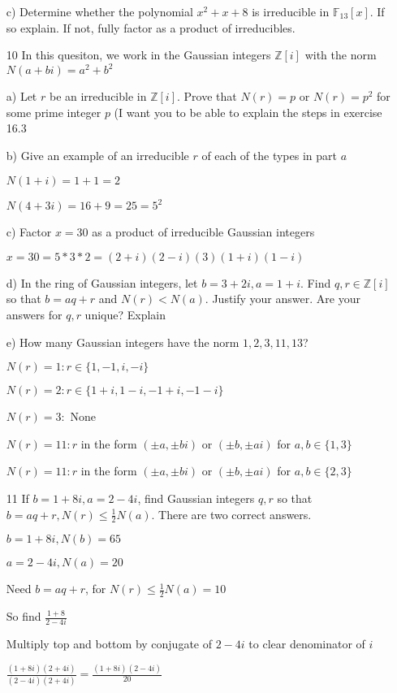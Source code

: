 \documentclass[12pt]{article}
\begin{document}
\begin{itemize}
		c) Determine whether the polynomial $x^2 + x + 8$ is irreducible in $\mathbb{F}_{13}[x]$. If so explain. If not, fully factor as a product of irreducibles.

	\item[10] In this quesiton, we work in the Gaussian integers $\mathbb{Z}[i]$  with the norm $N(a+bi) = a^2 + b^2$

		a) Let $r$ be an irreducible in $\mathbb{Z}[i]$. Prove that $N(r) = p$ or $N(r) = p^2$ for some prime integer $p$ (I want you to be able to explain the steps in exercise 16.3

		b) Give an example of an irreducible $r$ of each of the types in part $a$

		$N(1+i) = 1 + 1 = 2$

		$N(4 + 3i) = 16 + 9 = 25 = 5^2$

		c) Factor $x = 30$ as a product of irreducible Gaussian integers

		$x = 30 = 5 * 3 * 2 = (2 + i)(2-i)(3)(1+i)(1-i)$

		d) In the ring of Gaussian integers, let $b = 3 + 2i, a = 1+ i$. Find $q,r \in \mathbb{Z}[i]$ so that $b = aq + r$ and $N(r) < N(a)$. Justify your answer. Are your answers for $q,r$ unique? Explain

		e) How many Gaussian integers have the norm $1,2,3,11,13$?

		$N(r) = 1: r \in \{1, -1, i, -i\}$

		$N(r) = 2: r \in \{1+i, 1-i, -1+i, -1 - i\}$

		$N(r) = 3:$ None

		$N(r) = 11: r$ in the form $(\pm a, \pm b i)$ or $(\pm b, \pm a i)$ for $a,b \in \{1, 3\}$

		$N(r) = 11: r$ in the form $(\pm a, \pm b i)$ or $(\pm b, \pm a i)$ for $a,b \in \{2, 3\}$

	\item[11] If $b = 1 + 8i, a = 2-4i$, find Gaussian integers $q,r$ so that $b = aq + r, N(r) \leq \frac{1}{2} N(a)$. There are two correct answers.

		$b = 1 + 8i, N(b) = 65$

		$a = 2 - 4i, N(a) = 20$

		Need $b = aq + r$, for $N(r) \leq \frac{1}{2} N(a) = 10$

		So find $\frac{1+8}{2-4i}$

		Multiply top and bottom by conjugate of $2-4i$ to clear denominator of $i$

		$\frac{(1+8i)(2+4i)}{(2-4i)(2+4i)} = \frac{(1+8i)(2-4i)}{20}$


\end{itemize}
\end{document}
